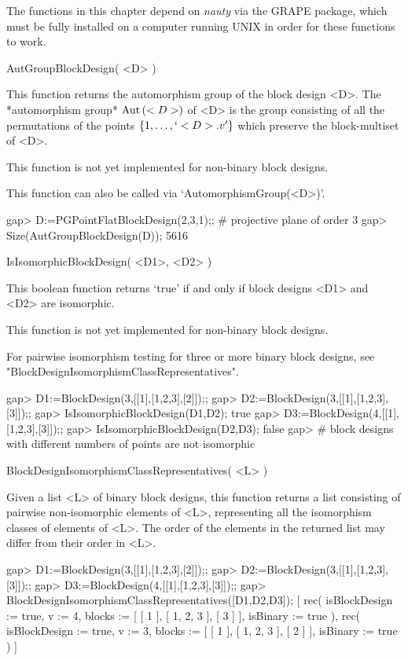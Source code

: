 %
%
%
%
\def\DESIGN{\sf DESIGN}
\def\GRAPE{\sf GRAPE}
\def\nauty{\it nauty}
\def\Aut{{\rm Aut}\,}


The functions in this chapter depend on {\nauty} via the {\GRAPE} package,
which must be fully installed on a computer running UNIX in order for
these functions to work.


\>AutGroupBlockDesign( <D> )

This function returns the automorphism group of the block design <D>.
The *automorphism group* $\Aut(<D>)$ of <D> is the group consisting of
all the permutations of the points $\{1,\ldots,`<D>.v'\}$ which preserve
the block-multiset of <D>.

This function is not yet implemented for non-binary block designs.

This function can also be called via `AutomorphismGroup(<D>)'.

\beginexample
gap> D:=PGPointFlatBlockDesign(2,3,1);; # projective plane of order 3
gap> Size(AutGroupBlockDesign(D));                            
5616
\endexample


\>IsIsomorphicBlockDesign( <D1>, <D2> )

This boolean function returns `true' if and only if block designs
<D1> and <D2> are isomorphic. 

This function is not yet implemented for non-binary block designs.

For pairwise isomorphism testing for three or more binary block designs,
see "BlockDesignIsomorphismClassRepresentatives".

\beginexample
gap> D1:=BlockDesign(3,[[1],[1,2,3],[2]]);;
gap> D2:=BlockDesign(3,[[1],[1,2,3],[3]]);;
gap> IsIsomorphicBlockDesign(D1,D2);
true
gap> D3:=BlockDesign(4,[[1],[1,2,3],[3]]);;
gap> IsIsomorphicBlockDesign(D2,D3);        
false
gap> # block designs with different numbers of points are not isomorphic
\endexample

\>BlockDesignIsomorphismClassRepresentatives( <L> )

Given a list <L> of binary block designs, this function returns a list
consisting of pairwise non-isomorphic elements of <L>, representing all
the isomorphism classes of elements of <L>. The order of the elements
in the returned list may differ from their order in <L>.

\beginexample 
gap> D1:=BlockDesign(3,[[1],[1,2,3],[2]]);;
gap> D2:=BlockDesign(3,[[1],[1,2,3],[3]]);;
gap> D3:=BlockDesign(4,[[1],[1,2,3],[3]]);; 
gap> BlockDesignIsomorphismClassRepresentatives([D1,D2,D3]);
[ rec( isBlockDesign := true, v := 4, blocks := [ [ 1 ], [ 1, 2, 3 ], [ 3 ] ],
      isBinary := true ), 
  rec( isBlockDesign := true, v := 3, blocks := [ [ 1 ], [ 1, 2, 3 ], [ 2 ] ],
      isBinary := true ) ]
\endexample
